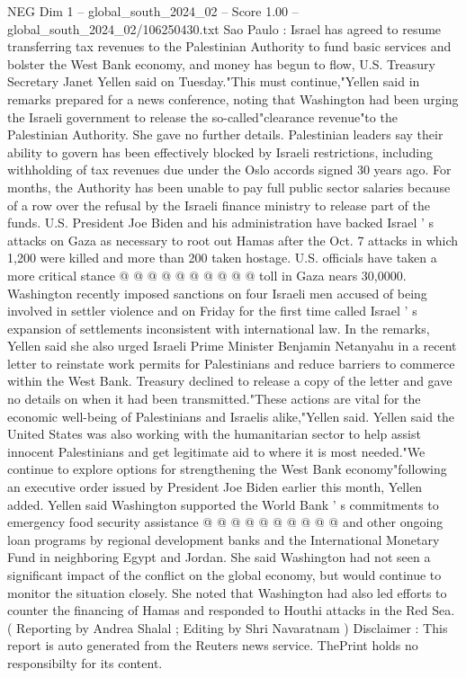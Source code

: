 \begin{textsample}{NEG Dim 1 – global\_south\_2024\_02 – Score 1.00 – global\_south\_2024\_02/106250430.txt}  \label{ex:f1_neg_254}
Sao Paulo : Israel has agreed to resume transferring tax revenues to the Palestinian Authority to fund basic services and bolster the West Bank economy, and money has begun to flow, U.S.
Treasury Secretary Janet Yellen said on Tuesday."This must continue,"Yellen said in remarks prepared for a news conference, noting that Washington had been urging the Israeli government to release the so-called"clearance revenue"to the Palestinian Authority.
She gave no further details.
Palestinian leaders say their ability to govern has been effectively blocked by Israeli restrictions, including withholding of tax revenues due under the Oslo accords signed 30 years ago.
For months, the Authority has been unable to pay full public sector salaries because of a row over the refusal by the Israeli finance ministry to release part of the funds.
U.S.
President Joe Biden and his administration have backed Israel ' s attacks on Gaza as necessary to root out Hamas after the Oct. 7 attacks in which 1,200 were killed and more than 200 taken hostage.
U.S. officials have taken a more critical stance @ @ @ @ @ @ @ @ @ @ toll in Gaza nears 30,0000.
Washington recently imposed sanctions on four Israeli men accused of being involved in settler violence and on Friday for the first time called Israel ' s expansion of settlements inconsistent with international law.
In the remarks, Yellen said she also urged Israeli Prime Minister Benjamin Netanyahu in a recent letter to reinstate work permits for Palestinians and reduce barriers to commerce within the West Bank.
Treasury declined to release a copy of the letter and gave no details on when it had been transmitted."These actions are vital for the economic well-being of Palestinians and Israelis alike,"Yellen said.
Yellen said the United States was also working with the humanitarian sector to help assist innocent Palestinians and get legitimate aid to where it is most needed."We continue to explore options for strengthening the West Bank economy"following an executive order issued by President Joe Biden earlier this month, Yellen added.
Yellen said Washington supported the World Bank ' s commitments to emergency food security assistance @ @ @ @ @ @ @ @ @ @ and other ongoing loan programs by regional development banks and the International Monetary Fund in neighboring Egypt and Jordan.
She said Washington had not seen a significant impact of the conflict on the global economy, but would continue to monitor the situation closely.
She noted that Washington had also led efforts to counter the financing of Hamas and responded to Houthi attacks in the Red Sea. ( Reporting by Andrea Shalal ; Editing by Shri Navaratnam ) Disclaimer : This report is auto generated from the Reuters news service.
ThePrint holds no responsibilty for its content.

\end{textsample}
